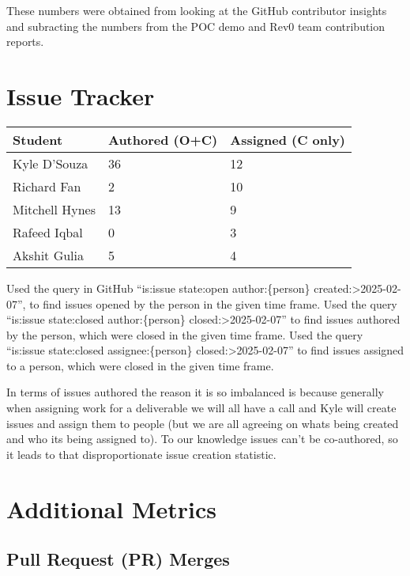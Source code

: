 \documentclass{article}
\begin{document}
These numbers were obtained from looking at the GitHub contributor
insights and subracting the numbers from the POC demo and Rev0 team
contribution reports.

\section{Issue Tracker}

\begin{table}[H]
  \centering
  \begin{tabular}{lll}
    \toprule
    \textbf{Student} & \textbf{Authored (O+C)} & \textbf{Assigned (C only)}\\
    \midrule
    Kyle D'Souza & 36 & 12 \\
    Richard Fan & 2 & 10 \\
    Mitchell Hynes & 13 & 9 \\
    Rafeed Iqbal & 0 & 3 \\
    Akshit Gulia & 5 & 4 \\
    \bottomrule
  \end{tabular}
\end{table}

Used the query in GitHub ``is:issue state:open author:\{person\}
created:\textgreater2025-02-07'', to find issues opened by the person
in the given time frame. Used the query ``is:issue state:closed
author:\{person\} closed:\textgreater2025-02-07'' to find issues
authored by the person, which were closed in the given time frame.
Used the query ``is:issue state:closed assignee:\{person\}
closed:\textgreater2025-02-07'' to find issues assigned to a person,
which were closed in the given time frame.

In terms of issues authored the reason it is so imbalanced is because
generally when assigning work for a deliverable we will all have a
call and Kyle will create issues and assign them to people (but
  we are all agreeing on whats being created and who its being assigned
to). To our knowledge issues can't be co-authored, so it leads to
that disproportionate issue creation statistic.

\section{Additional Metrics}

\subsection{Pull Request (PR) Merges}
\end{document}
